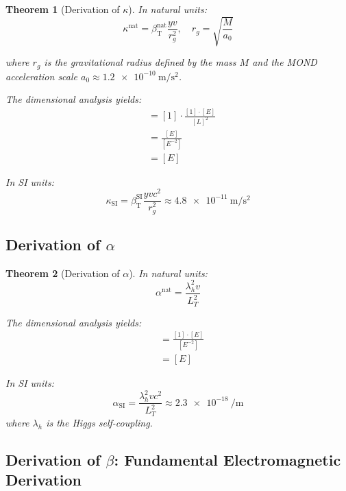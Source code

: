 ﻿\documentclass[12pt,a4paper]{article}
\newcommand{\betaT}{\beta_{\text{T}}}
\newtheorem{theorem}{Theorem}[section]
\begin{document}
	\begin{theorem}[Derivation of \(\kappa\)]
		In natural units:
		\begin{equation}
			\kappa^{\text{nat}} = \betaT^{\text{nat}} \frac{y v}{r_g^2}, \quad r_g = \sqrt{\frac{M}{a_0}}
		\end{equation}
		
		where \(r_g\) is the gravitational radius defined by the mass \(M\) and the MOND acceleration scale \(a_0 \approx \SI{1.2e-10}{\meter\per\second\squared}\).
		
		The dimensional analysis yields:
		\begin{align}
			[\kappa^{\text{nat}}] &= [1] \cdot \frac{[1] \cdot [E]}{[L]^2} \\
			&= \frac{[E]}{[E^{-2}]} \\
			&= [E]
		\end{align}
		
		In SI units:
		\begin{equation}
			\kappa_{\text{SI}} = \betaT^{\text{SI}} \frac{y v c^2}{r_g^2} \approx \SI{4.8e-11}{\meter\per\second\squared}
		\end{equation}
	\end{theorem}
	
	\subsection{Derivation of \(\alpha\)}
	
	\begin{theorem}[Derivation of \(\alpha\)]
		In natural units:
		\begin{equation}
			\alpha^{\text{nat}} = \frac{\lambda_h^2 v}{L_T^2}
		\end{equation}
		
		The dimensional analysis yields:
		\begin{align}
			[\alpha^{\text{nat}}] &= \frac{[1] \cdot [E]}{[E^{-2}]} \\
			&= [E]
		\end{align}
		
		In SI units:
		\begin{equation}
			\alpha_{\text{SI}} = \frac{\lambda_h^2 v c^2}{L_T^2} \approx \SI{2.3e-18}{\per\meter}
		\end{equation}
		where \(\lambda_h\) is the Higgs self-coupling.
	\end{theorem}
	
	\subsection{Derivation of \(\beta\): Fundamental Electromagnetic Derivation}
	
\end{document}
